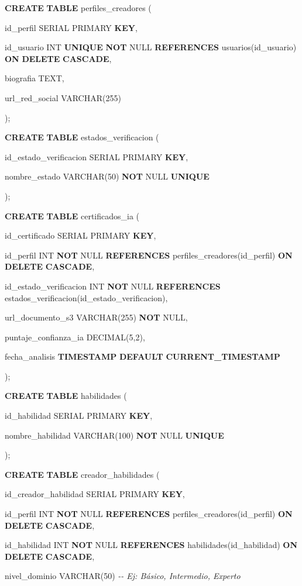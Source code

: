 \documentclass[
]{article}
\begin{document}
\textbf{CREATE} \textbf{TABLE} perfiles\_creadores (

id\_perfil SERIAL PRIMARY \textbf{KEY},

id\_usuario INT \textbf{UNIQUE} \textbf{NOT} NULL \textbf{REFERENCES}
usuarios(id\_usuario) \textbf{ON} \textbf{DELETE} \textbf{CASCADE},

biografia TEXT,

url\_red\_social VARCHAR(255)

);

\textbf{CREATE} \textbf{TABLE} estados\_verificacion (

id\_estado\_verificacion SERIAL PRIMARY \textbf{KEY},

nombre\_estado VARCHAR(50) \textbf{NOT} NULL \textbf{UNIQUE}

);

\textbf{CREATE} \textbf{TABLE} certificados\_ia (

id\_certificado SERIAL PRIMARY \textbf{KEY},

id\_perfil INT \textbf{NOT} NULL \textbf{REFERENCES}
perfiles\_creadores(id\_perfil) \textbf{ON} \textbf{DELETE}
\textbf{CASCADE},

id\_estado\_verificacion INT \textbf{NOT} NULL \textbf{REFERENCES}
estados\_verificacion(id\_estado\_verificacion),

url\_documento\_s3 VARCHAR(255) \textbf{NOT} NULL,

puntaje\_confianza\_ia DECIMAL(5,2),

fecha\_analisis \textbf{TIMESTAMP} \textbf{DEFAULT}
\textbf{CURRENT\_TIMESTAMP}

);

\textbf{CREATE} \textbf{TABLE} habilidades (

id\_habilidad SERIAL PRIMARY \textbf{KEY},

nombre\_habilidad VARCHAR(100) \textbf{NOT} NULL \textbf{UNIQUE}

);

\textbf{CREATE} \textbf{TABLE} creador\_habilidades (

id\_creador\_habilidad SERIAL PRIMARY \textbf{KEY},

id\_perfil INT \textbf{NOT} NULL \textbf{REFERENCES}
perfiles\_creadores(id\_perfil) \textbf{ON} \textbf{DELETE}
\textbf{CASCADE},

id\_habilidad INT \textbf{NOT} NULL \textbf{REFERENCES}
habilidades(id\_habilidad) \textbf{ON} \textbf{DELETE} \textbf{CASCADE},

nivel\_dominio VARCHAR(50) \emph{-\/- Ej: Básico, Intermedio, Experto}
\end{document}

